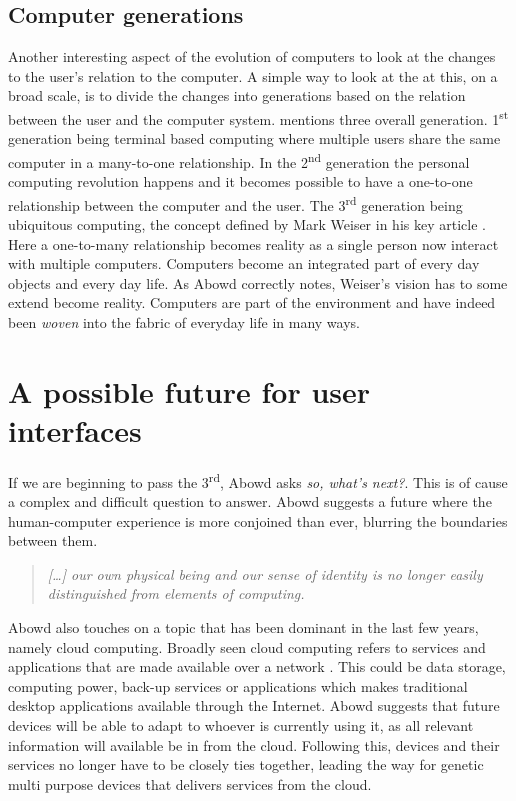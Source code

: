 \subsection{Computer generations}
Another interesting aspect of the evolution of computers to look at the changes to the user's relation to the computer.
A simple way to look at the at this, on a broad scale, is to divide the changes into generations based on the relation between the user and the computer system.
\citet{abowd2012next} mentions three overall generation.
1\textsuperscript{st} generation being terminal based computing where multiple users share the same computer in a many-to-one relationship.
In the 2\textsuperscript{nd} generation the personal computing revolution happens and it becomes possible to have a one-to-one relationship between the computer and the user.
The 3\textsuperscript{rd} generation being ubiquitous computing, the concept defined by Mark Weiser in his key article \citep{weiser1991computer}.
Here a one-to-many relationship becomes reality as a single person now interact with multiple computers. Computers become an integrated part of every day objects and every day life. 
As Abowd correctly notes, Weiser's vision has to some extend become reality. 
Computers are part of the environment and have indeed been \textit{woven} into the fabric of everyday life in many ways.   

\section{A possible future for user interfaces}
If we are beginning to pass the 3\textsuperscript{rd}, Abowd asks \textit{so, what's next?}.
This is of cause a complex and difficult question to answer.
Abowd suggests a future where the human-computer experience is more conjoined than ever, blurring the boundaries between them.
\begin{quote}
\emph{[\ldots] our own physical being and our sense of identity is no longer easily distinguished from elements of computing.}
\end{quote}
Abowd also touches on a topic that has been dominant in the last few years, namely cloud computing.
Broadly seen cloud computing refers to services and applications that are made available over a network .
This could be data storage, computing power, back-up services or applications which makes traditional desktop applications available through the Internet.
Abowd suggests that future devices will be able to adapt to whoever is currently using it, as all relevant information will available be in from the cloud.
Following this, devices and their services no longer have to be closely ties together, leading the way for genetic multi purpose devices that delivers services from the cloud.

